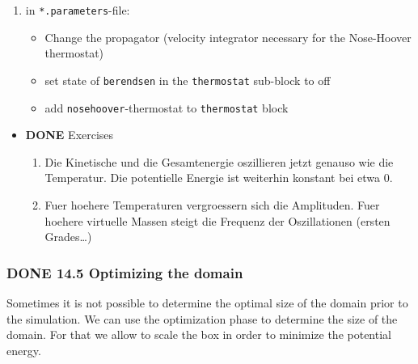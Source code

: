 \documentclass[11pt]{article}
\begin{document}
\begin{enumerate}
\item in \texttt{*.parameters}-file:

\begin{itemize}
\item Change the propagator (velocity integrator necessary for the Nose-Hoover thermostat)
\item set state of \texttt{berendsen} in the \texttt{thermostat} sub-block to off
\item add \texttt{nosehoover}-thermostat to \texttt{thermostat} block
\end{itemize}

\end{enumerate}
\begin{itemize}

\item \textbf{DONE} Exercises\\
\label{sec-2.4.4.1}

\begin{enumerate}
\item Die Kinetische und die Gesamtenergie oszillieren jetzt genauso wie die Temperatur. Die potentielle Energie ist weiterhin konstant bei etwa 0.
\item Fuer hoehere Temperaturen vergroessern sich die Amplituden. Fuer hoehere virtuelle Massen steigt die Frequenz der Oszillationen (ersten Grades\ldots{})
\end{enumerate}
\end{itemize} %
\subsubsection{\textbf{DONE} 14.5 Optimizing the domain}
\label{sec-2.4.5}

      Sometimes it is not possible to determine the optimal size of the domain prior to the simulation. 
      We can use the optimization phase to determine the size of the domain. For that we allow to scale the box in order to minimize the potential energy. 
\end{document}
